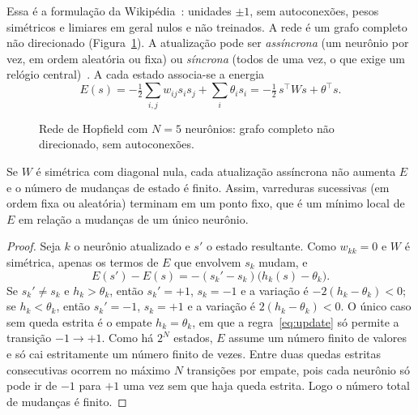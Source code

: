 Essa é a formulação da Wikipédia~\cite{wikihopfield}: unidades $\pm1$, sem autoconexões, pesos simétricos e
limiares em geral nulos e não treinados. A rede é um grafo completo não direcionado
(Figura~\ref{fig:grafo}). A atualização pode ser \emph{assíncrona} (um neurônio por vez, em ordem aleatória
ou fixa) ou \emph{síncrona} (todos de uma vez, o que exige um relógio central)~\cite{wikihopfield}. A cada
estado associa-se a energia
\begin{equation}\label{eq:energia}
E(s)=-\tfrac12\sum_{i,j}w_{ij}s_is_j+\sum_i\theta_is_i=-\tfrac12\,s^{\top}Ws+\theta^{\top}s .
\end{equation}

\begin{figure}[htbp]
\centering
{}
\caption{Rede de Hopfield com $N=5$ neurônios: grafo completo não direcionado, sem autoconexões.}
\label{fig:grafo}
\end{figure}

\begin{proposicao}\label{prop:conv}
Se $W$ é simétrica com diagonal nula, cada atualização assíncrona não aumenta $E$ e o número de mudanças de
estado é finito. Assim, varreduras sucessivas (em ordem fixa ou aleatória) terminam em um ponto fixo, que é
um mínimo local de $E$ em relação a mudanças de um único neurônio.
\end{proposicao}
\begin{proof}
Seja $k$ o neurônio atualizado e $s'$ o estado resultante. Como $w_{kk}=0$ e $W$ é simétrica, apenas os
termos de $E$ que envolvem $s_k$ mudam, e
\[
E(s')-E(s)=-(s_k'-s_k)\bigl(h_k(s)-\theta_k\bigr).
\]
Se $s_k'\neq s_k$ e $h_k>\theta_k$, então $s_k'=+1$, $s_k=-1$ e a variação é $-2(h_k-\theta_k)<0$; se
$h_k<\theta_k$, então $s_k'=-1$, $s_k=+1$ e a variação é $2(h_k-\theta_k)<0$. O único caso sem queda estrita
é o empate $h_k=\theta_k$, em que a regra~\eqref{eq:update} só permite a transição $-1\to+1$. Como há $2^N$
estados, $E$ assume um número finito de valores e só cai estritamente um número finito de vezes. Entre duas
quedas estritas consecutivas ocorrem no máximo $N$ transições por empate, pois cada neurônio só pode ir de
$-1$ para $+1$ uma vez sem que haja queda estrita. Logo o número total de mudanças é finito.
\end{proof}

